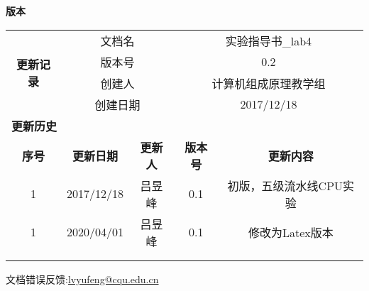 \textbf{版本}

\begin{table}[htbp]
    \centering
    \begin{tabular}{|c|c|c|c|c|}
        \hline
        \multirow{4}{*}{\textbf{更新记录}} & \multicolumn{2}{c|}{文档名} & \multicolumn{2}{c|}{实验指导书\_lab4} \\
        \cline{2-5} & \multicolumn{2}{c|}{版本号} & \multicolumn{2}{c|}{0.2} \\
        \cline{2-5} & \multicolumn{2}{c|}{创建人} & \multicolumn{2}{c|}{计算机组成原理教学组} \\
        \cline{2-5} & \multicolumn{2}{c|}{创建日期} & \multicolumn{2}{c|}{2017/12/18} \\
        \hline
        \multicolumn{5}{|l|}{\textbf{更新历史}} \\
        \hline
        \textbf{序号} & \textbf{更新日期} & \textbf{更新人} & \textbf{版本号} & \textbf{更新内容} \\
        \hline 
        1 & 2017/12/18 & 吕昱峰 & 0.1 & 初版，五级流水线CPU实验\\
        \hline
        1 & 2020/04/01 & 吕昱峰 & 0.1 & 修改为Latex版本\\
        \hline
         & & & & \\
        \hline
         & & & & \\
        \hline
    \end{tabular}
    \label{tab:guide_book_version}
\end{table}


文档错误反馈:\url{lvyufeng@cqu.edu.cn}